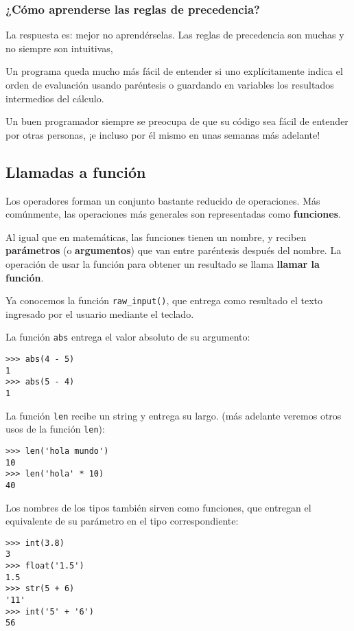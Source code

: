 \subsubsection{¿Cómo aprenderse las reglas de precedencia?}

La respuesta es: mejor no aprendérselas. Las reglas de precedencia son
muchas y no siempre son intuitivas,

Un programa queda mucho más fácil de entender si uno explícitamente
indica el orden de evaluación usando paréntesis o guardando en variables
los resultados intermedios del cálculo.

Un buen programador siempre se preocupa de que su código sea fácil de
entender por otras personas, ¡e incluso por él mismo en unas semanas más
adelante!

\subsection{Llamadas a función}

Los operadores forman un conjunto bastante reducido de operaciones. Más
comúnmente, las operaciones más generales son representadas como
\textbf{funciones}.

Al igual que en matemáticas, las funciones tienen un nombre, y reciben
\textbf{parámetros} (o \textbf{argumentos}) que van entre paréntesis
después del nombre. La operación de usar la función para obtener un
resultado se llama \textbf{llamar la función}.

Ya conocemos la función \lstinline!raw_input()!, que entrega como
resultado el texto ingresado por el usuario mediante el teclado.

La función \lstinline!abs! entrega el valor absoluto de su argumento:

\begin{lstlisting}
>>> abs(4 - 5)
1
>>> abs(5 - 4)
1
\end{lstlisting}

La función \lstinline!len! recibe un string y entrega su largo. (más
adelante veremos otros usos de la función \lstinline!len!):

\begin{lstlisting}
>>> len('hola mundo')
10
>>> len('hola' * 10)
40
\end{lstlisting}

Los nombres de los tipos también sirven como funciones, que entregan el
equivalente de su parámetro en el tipo correspondiente:

\begin{lstlisting}
>>> int(3.8)
3
>>> float('1.5')
1.5
>>> str(5 + 6)
'11'
>>> int('5' + '6')
56
\end{lstlisting}

